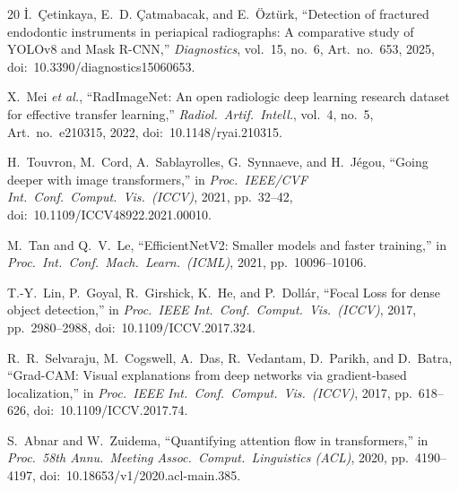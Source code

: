 \documentclass[conference]{IEEEtran}
\begin{document}
\begin{thebibliography}{20}
\.{I}.~\c{C}etinkaya, E.~D. \c{C}atmabacak, and E.~\"{O}zt\"{u}rk,
``Detection of fractured endodontic instruments in periapical radiographs:
A comparative study of YOLOv8 and Mask R-CNN,''
\textit{Diagnostics}, vol.~15, no.~6, Art.\ no.~653, 2025,
doi:~10.3390/diagnostics15060653.

X.~Mei \textit{et al.},
``RadImageNet: An open radiologic deep learning research dataset for
effective transfer learning,''
\textit{Radiol.\ Artif.\ Intell.}, vol.~4, no.~5, Art.\ no.~e210315, 2022,
doi:~10.1148/ryai.210315.

H.~Touvron, M.~Cord, A.~Sablayrolles, G.~Synnaeve, and H.~J\'{e}gou,
``Going deeper with image transformers,''
in \textit{Proc.\ IEEE/CVF Int.\ Conf.\ Comput.\ Vis.\ (ICCV)}, 2021,
pp.~32--42, doi:~10.1109/ICCV48922.2021.00010.

M.~Tan and Q.~V.~Le,
``EfficientNetV2: Smaller models and faster training,''
in \textit{Proc.\ Int.\ Conf.\ Mach.\ Learn.\ (ICML)}, 2021,
pp.~10096--10106.

T.-Y.~Lin, P.~Goyal, R.~Girshick, K.~He, and P.~Doll\'{a}r,
``Focal Loss for dense object detection,''
in \textit{Proc.\ IEEE Int.\ Conf.\ Comput.\ Vis.\ (ICCV)}, 2017,
pp.~2980--2988, doi:~10.1109/ICCV.2017.324.

R.~R.~Selvaraju, M.~Cogswell, A.~Das, R.~Vedantam, D.~Parikh, and D.~Batra,
``Grad-CAM: Visual explanations from deep networks via gradient-based
localization,''
in \textit{Proc.\ IEEE Int.\ Conf.\ Comput.\ Vis.\ (ICCV)}, 2017,
pp.~618--626, doi:~10.1109/ICCV.2017.74.

S.~Abnar and W.~Zuidema,
``Quantifying attention flow in transformers,''
in \textit{Proc.\ 58th Annu.\ Meeting Assoc.\ Comput.\ Linguistics (ACL)},
2020, pp.~4190--4197, doi:~10.18653/v1/2020.acl-main.385.

\end{thebibliography}
\end{document}
